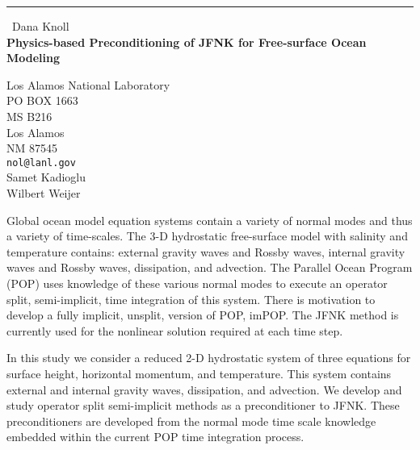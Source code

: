 \documentclass{report}
\begin{document}
\begin{center}
\rule{6in}{1pt} \
{\large Dana Knoll \\
{\bf Physics-based Preconditioning of JFNK for Free-surface Ocean Modeling}}

Los Alamos National Laboratory \\ PO BOX 1663 \\ MS B216 \\ Los Alamos \\ NM 87545
\\
{\tt nol@lanl.gov}\\
Samet Kadioglu\\
Wilbert Weijer\end{center}

Global ocean model equation systems contain a variety of normal modes and thus
a variety of time-scales. The 3-D hydrostatic free-surface model with
salinity and temperature contains: external gravity waves and Rossby
waves, internal gravity waves and Rossby waves, dissipation, and
advection. The Parallel Ocean Program (POP) uses knowledge of these
various normal modes to execute an operator split, semi-implicit, time
integration of this system. There is motivation to develop a fully
implicit, unsplit, version of POP, imPOP. The JFNK method
is currently used for the nonlinear solution required at each time step.

In this study we consider a reduced 2-D hydrostatic system of three
equations for surface height, horizontal momentum, and temperature. This
system contains external and internal gravity waves, dissipation, and
advection. We develop and study operator split semi-implicit methods as a
preconditioner to JFNK. These preconditioners are developed from the
normal mode time scale knowledge embedded within the current POP time
integration process.
\end{document}
